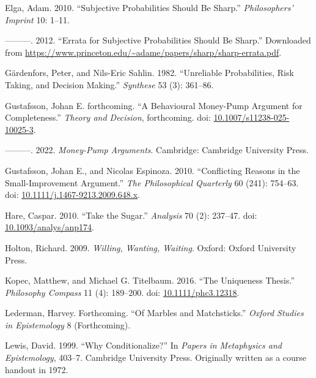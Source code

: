 \documentclass[
  11pt,
  letterpaper,
  DIV=11,
  numbers=noendperiod,
  twoside]{scrartcl}
\newlength{\cslhangindent}
\newenvironment{CSLReferences}[2] %
 {\begin{list}{}{%
  \setlength{\itemindent}{0pt}
  \setlength{\leftmargin}{0pt}
  \setlength{\parsep}{0pt}
  \ifodd #1
   \setlength{\leftmargin}{\cslhangindent}
   \setlength{\itemindent}{-1\cslhangindent}
  \fi
  \setlength{\itemsep}{#2\baselineskip}}}
 {\end{list}}
\begin{document}
\begin{CSLReferences}{1}{0}
Elga, Adam. 2010. {``Subjective Probabilities Should Be Sharp.''}
\emph{Philosophers' Imprint} 10: 1--11.

---------. 2012. {``Errata for Subjective Probabilities Should Be
Sharp.''} Downloaded from
\url{https://www.princeton.edu/~adame/papers/sharp/sharp-errata.pdf}.

Gärdenfors, Peter, and Nils-Eric Sahlin. 1982. {``Unreliable
Probabilities, Risk Taking, and Decision Making.''} \emph{Synthese} 53
(3): 361--86.

Gustafsson, Johan E. forthcoming. {``A Behavioural Money-Pump Argument
for Completeness.''} \emph{Theory and Decision}, forthcoming. doi:
\href{https://doi.org/10.1007/s11238-025-10025-3}{10.1007/s11238-025-10025-3}.

---------. 2022. \emph{Money-Pump Arguments}. Cambridge: Cambridge
University Press.

Gustafsson, Johan E., and Nicolas Espinoza. 2010. {``Conflicting Reasons
in the Small-Improvement Argument.''} \emph{The Philosophical Quarterly}
60 (241): 754--63. doi:
\href{https://doi.org/10.1111/j.1467-9213.2009.648.x}{10.1111/j.1467-9213.2009.648.x}.

Hare, Caspar. 2010. {``Take the Sugar.''} \emph{Analysis} 70 (2):
237--47. doi:
\href{https://doi.org/10.1093/analys/anp174}{10.1093/analys/anp174}.

Holton, Richard. 2009. \emph{Willing, Wanting, Waiting}. Oxford: Oxford
University Press.

Kopec, Matthew, and Michael G. Titelbaum. 2016. {``The Uniqueness
Thesis.''} \emph{Philosophy Compass} 11 (4): 189--200. doi:
\href{https://doi.org/10.1111/phc3.12318}{10.1111/phc3.12318}.

Lederman, Harvey. Forthcoming. {``Of Marbles and Matchsticks.''}
\emph{Oxford Studies in Epistemology} 8 (Forthcoming).

Lewis, David. 1999. {``Why Conditionalize?''} In \emph{Papers in
Metaphysics and Epistemology}, 403--7. Cambridge University Press.
Originally written as a course handout in 1972.


\end{CSLReferences}
\end{document}
